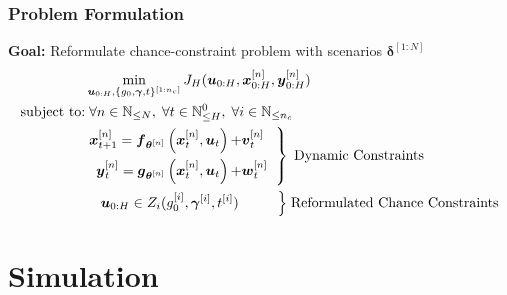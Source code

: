 \documentclass[student, noshadow, itr, english, aspectratio=169]{ITR_LSR_slides}
\begin{document}
\begin{frame}
	\frametitle{Problem Formulation}
\textbf{Goal:} Reformulate chance-constraint problem with scenarios $\boldsymbol{\delta}^{[1:N]}$
\begin{align*} 
 &\min\limits_{\boldsymbol{u}_{0:H}, \{g_0, \boldsymbol{\gamma}, t\}^{[1:n_c]}} J_H(\boldsymbol{u}_{0:H},  \boldsymbol{x}_{0:H}^{[n]},  \boldsymbol{y}_{0:H}^{[n]}) \\
\text{subject to:}&\; \forall n \in \mathbb{N}_{\leq N}, \;  \forall t \in \mathbb{N}_{\leq H}^0, \; \forall i \in \mathbb{N}_{\leq n_c}  \\
&\left. 
\begin {aligned}
\boldsymbol{x}_{t+1}^{[n]} = \boldsymbol{f}_{\boldsymbol{\theta}^{[n]}} \left( \boldsymbol{x}_{t}^{[n]} , \boldsymbol{u}_t \right) + & \boldsymbol{v}_{t}^{[n]}\\
\boldsymbol{y}_{t}^{[n]} = \boldsymbol{g}_{\boldsymbol{\theta}^{[n]}} \left( \boldsymbol{x}_{t}^{[n]}, \boldsymbol{u}_t \right) + & \boldsymbol{w}_{t}^{[n]} 
\end{aligned}
 \;\;  \right\} \; \text{Dynamic Constraints} \\
&\;\;\;\; \boldsymbol{u}_{0:H} \in Z_i(g_0^{[i]}, \boldsymbol{\gamma}^{[i]}, t^{[i]}) \;\;\;\;\;\; \;\;\;\;  \Bigl\} \; \text{Reformulated Chance Constraints}
\end{align*}



\end{frame}

\section{Simulation}
\end{document}
